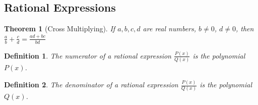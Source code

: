 \documentclass[oneside]{book}
\theoremstyle{mystyle}
\newtheorem{theorem}{Theorem}[section]
\newtheorem{definition}{Definition}[section]
\begin{document}
\subsection{Rational Expressions}
\begin{theorem}[Cross Multiplying]
\label{theorem:north_shore_cross_multiplying}
If $a,b,c,d$ are real numbers, $b\ne 0$, $d\ne 0$, then $\frac{a}{b} +\frac{c}{d} = \frac{ad+bc}{bd}$
\end{theorem}
\begin{definition}
\label{definition:north_shore_numerator_of_rational_expression}
The numerator of a rational expression $\frac{P(x)}{Q(x)}$ is the polynomial $P(x)$.
\end{definition}
\begin{definition}
\label{definition:north_shore_denominator_of_rational_expression}
The denominator of a rational expression $\frac{P(x)}{Q(x)}$ is the polynomial $Q(x)$.
\end{definition}
\end{document}
